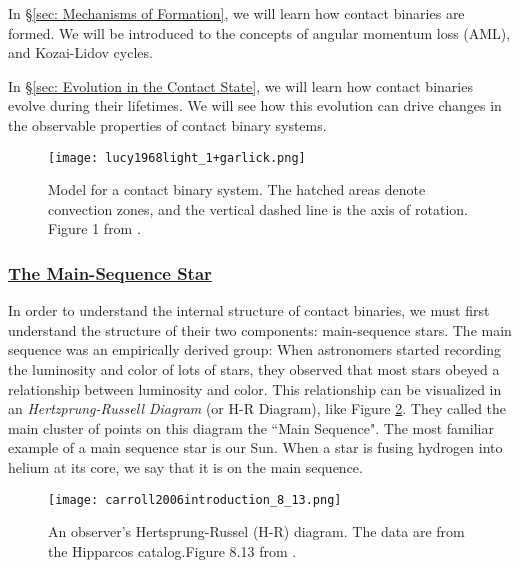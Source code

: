 \documentclass[12pt]{article} %
\numberwithin{equation}{section} %
\begin{document}
In \S \ref{sec: Mechanisms of Formation}, we will learn how contact binaries are formed. We will be introduced to the concepts of angular momentum loss (AML), and Kozai-Lidov cycles.

In \S \ref{sec: Evolution in the Contact State}, we will learn how contact binaries evolve during their lifetimes. We will see how this evolution can drive changes in the observable properties of contact binary systems.


\begin{figure}[H]
\centering
\texttt{[image: lucy1968light\_1+garlick.png]}
\caption{Model for a contact binary system. The hatched areas denote convection zones, and the vertical dashed line is the axis of rotation. Figure 1 from \citet{lucy1968light}.}
\label{fig: lucy1968light_1}
\end{figure}

\subsubsection[The Main-Sequence Star]{\hyperlink{toc}{The Main-Sequence Star}} \label{sec: The Main-Sequence Star}

In order to understand the internal structure of contact binaries, we must first understand the structure of their two components: main-sequence stars.  The main sequence was an empirically derived group: When astronomers started recording the luminosity and color of lots of stars, they observed that most stars obeyed a relationship between luminosity and color. This relationship can be visualized in an \emph{Hertzprung-Russell Diagram} (or H-R  Diagram), like Figure \ref{fig: carroll2006introduction_8_13}. They called the main cluster of points on this diagram the ``Main Sequence". The most familiar example of a main sequence star is our Sun. When a star is fusing hydrogen into helium at its core, we say that it is on the main sequence.

\begin{figure}[H]
\centering
\texttt{[image: carroll2006introduction\_8\_13.png]}
\caption{An observer's Hertsprung-Russel (H-R) diagram. The data are from the Hipparcos catalog.Figure 8.13 from \citet{carroll2006introduction}.}
\label{fig: carroll2006introduction_8_13}
\end{figure}
\end{document}

